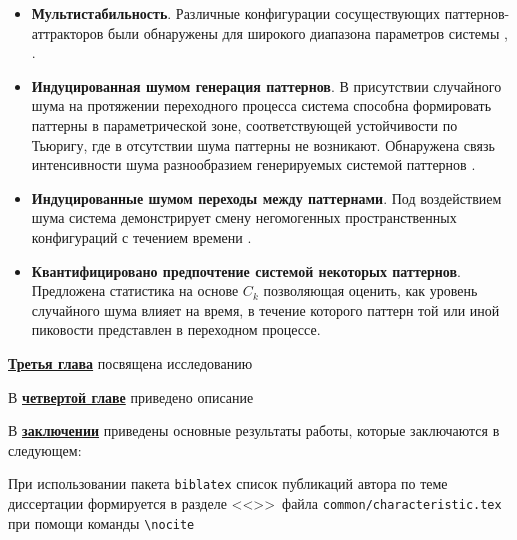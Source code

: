 \begin{itemize}
    \item \textbf{Мультистабильность}. Различные конфигурации сосуществующих паттернов-аттракторов были обнаружены для широкого диапазона параметров системы \cite{bib3}, \cite{bib4}.
    \item \textbf{Индуцированная шумом генерация паттернов}. В присутствии случайного шума на протяжении переходного процесса система способна формировать паттерны в параметрической зоне, соответствующей устойчивости по Тьюригу, где в отсутствии шума паттерны не возникают. Обнаружена связь интенсивности шума разнообразием генерируемых системой паттернов \cite{bib3}.
    \item \textbf{Индуцированные шумом переходы между паттернами}. Под воздействием шума система демонстрирует смену негомогенных пространственных конфигураций с течением времени \cite{bib4}.
    \item \textbf{Квантифицировано предпочтение системой некоторых паттернов}. Предложена статистика на основе $C_k$ позволяющая оценить, как уровень случайного шума влияет на время, в течение которого паттерн той или иной пиковости представлен в переходном процессе.
\end{itemize}


\underline{\textbf{Третья глава}} посвящена исследованию

В \underline{\textbf{четвертой главе}} приведено описание

\FloatBarrier
{}                                  %
В \underline{\textbf{заключении}} приведены основные результаты работы, которые заключаются в следующем:


При использовании пакета \verb!biblatex! список публикаций автора по теме
диссертации формируется в разделе <<\publications>>\ файла
\verb!common/characteristic.tex!  при помощи команды \verb!\nocite!

